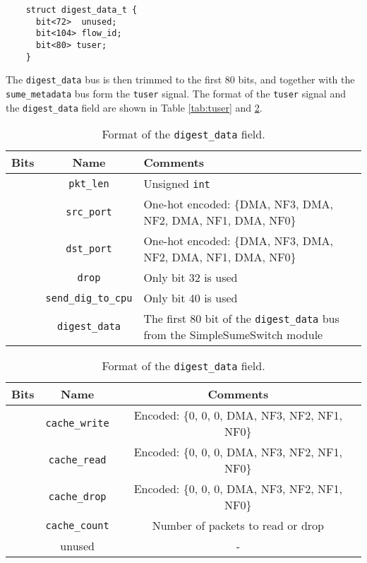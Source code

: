 {\renewcommand{\baselinestretch}{0.8}\small
	\begin{verbatim}
    struct digest_data_t {
      bit<72>  unused;
      bit<104> flow_id;
      bit<80> tuser;
    }
	\end{verbatim}
}

The \verb|digest_data| bus is then trimmed to the first 80 bits, and together with the \verb|sume_metadata| bus form the \texttt{tuser} signal. The format of the \texttt{tuser} signal and the \texttt{digest\_data} field are shown in Table \ref{tab:tuser} and \ref{tab:digest-data}.

\begin{table}[!h]
	\centering
	\caption{Format of the \texttt{tuser} signal.}
	\label{tab:tuser}
	\begin{tabular}{ | c | c | >{\centering\arraybackslash}m{9.5cm} |}
		\hline
		\textbf{Bits} & \textbf{Name} & \textbf{Comments} \\ \hline
		[15:0] & \verb|pkt_len| & Unsigned \verb|int| \\ \hline
		[23:16] & \verb|src_port| & One-hot encoded: \{DMA, NF3, DMA, NF2, DMA, NF1, DMA, NF0\} \\ \hline
		[31:24] & \verb|dst_port| & One-hot encoded: \{DMA, NF3, DMA, NF2, DMA, NF1, DMA, NF0\} \\ \hline
		[39:32] & \verb|drop| & Only bit 32 is used \\ \hline
		[47:40] & \verb|send_dig_to_cpu| & Only bit 40 is used \\ \hline
		[127:48] & \verb|digest_data| & The first 80 bit of the \verb|digest_data| bus from the SimpleSumeSwitch module \\ \hline
	\end{tabular}
	\vspace{1em}
	\centering
	\caption{Format of the \texttt{digest\_data} field.}
	\label{tab:digest-data}
	\begin{tabular}{ | c | c | c |}
		\hline
		\textbf{Bits} & \textbf{Name} & \textbf{Comments} \\ \hline
		[55:48] & \verb|cache_write| & Encoded: \{0, 0, 0, DMA, NF3, NF2, NF1, NF0\} \\ \hline
		[63:56] & \verb|cache_read| & Encoded: \{0, 0, 0, DMA, NF3, NF2, NF1, NF0\} \\ \hline
		[71:64] & \verb|cache_drop| & Encoded: \{0, 0, 0, DMA, NF3, NF2, NF1, NF0\} \\ \hline
		[79:72] & \verb|cache_count| & Number of packets to read or drop \\ \hline
		[127:80] & unused & - \\ \hline
	\end{tabular}
\end{table}

